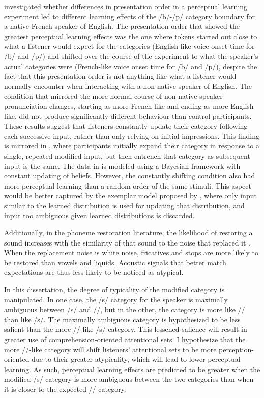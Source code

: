 \citet{Sumner2011} investigated whether differences in presentation order in a perceptual learning experiment led to different learning effects of the /b/-/p/ category boundary for a native French speaker of English.  
The presentation order that showed the greatest perceptual learning effects was the one where tokens started out close to what a listener would expect for the categories (English-like voice onset time for /b/ and /p/) and shifted over the course of the experiment to what the speaker's actual categories were (French-like voice onset time for /b/ and /p/), despite the fact that this presentation order is not anything like what a listener would normally encounter when interacting with a non-native speaker of English.  
The condition that mirrored the more normal course of non-native speaker pronunciation changes, starting as more French-like and ending as more English-like, did not produce significantly different behaviour than control participants.  
These results suggest that listeners constantly update their category following each successive input, rather than only relying on initial impressions.
This finding is mirrored in \citet{Vroomen2007}, where participants initially expand their category in response to a single, repeated modified input, but then entrench that category as subsequent input is the same.
The data in \citet{Vroomen2007} is modeled using a Bayesian framework with constant updating of beliefs.
However, the constantly shifting condition also had more perceptual learning than a random order of the same stimuli.
This aspect would be better captured by the exemplar model proposed by \citet{Pierrehumbert2001}, where only input similar to the learned distribution is used for updating that distribution, and input too ambiguous given learned distributions is discarded.

Additionally, in the phoneme restoration literature, the likelihood of restoring a sound increases with the similarity of that sound to the noise that replaced it \citep{Samuel1981}.  
When the replacement noise is white noise, fricatives and stops are more likely to be restored than vowels and liquids.
Acoustic signals that better match expectations are thus less likely to be noticed as atypical.

In this dissertation, the degree of typicality of the modified category is manipulated.  
In one case, the /s/ category for the speaker is maximally ambiguous between /s/ and /\textesh/, but in the other, the category is more like /\textesh/ than like /s/.
The maximally ambiguous category is hypothesized to be less salient than the more /\textesh/-like /s/ category.
This lessened salience will result in greater use of comprehension-oriented attentional sets.
I hypothesize that the more /\textesh/-like category will shift listeners' attentional sets to be more perception-oriented due to their greater atypicality, which will lead to lower perceptual learning.
As such, perceptual learning effects are predicted to be greater when the modified /s/ category is more ambiguous between the two categories than when it is closer to the expected /\textesh/ category.

